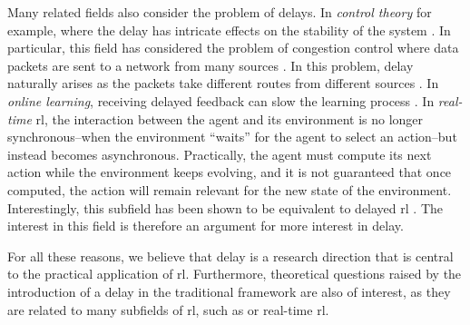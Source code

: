 Many related fields also consider the problem of delays.
In \emph{control theory} for example, \cite{chung1995time, dugard1998stability, niculescu2001delay, gu2003survey, richard2003time, fridman2014introduction} where the delay has intricate effects on the stability of the system \cite{kolmanovskii1999delay}.
In particular, this field has considered the problem of congestion control where data packets are sent to a network from many sources \cite{jacobson1988congestion}.
In this problem, delay naturally arises as the packets take different routes from different sources \cite{witsenhausen1971separation, altman1999congestion,ait2003stability}.
In \emph{online learning}, receiving delayed feedback can slow the learning process \cite{joulani2013online,pike2018bandits,lancewicki2021stochastic}.
In \emph{real-time} \gls{rl}, the interaction between the agent and its environment is no longer synchronous--when the environment ``waits'' for the agent to select an action--but instead becomes asynchronous.
Practically, the agent must compute its next action while the environment keeps evolving, and it is not guaranteed that once computed, the action will remain relevant for the new state of the environment.
Interestingly, this subfield has been shown to be equivalent to delayed \gls{rl} \cite[Theorem~1]{ramstedt2019real}.
The interest in this field \cite{hester2013texplore,caarls2015parallel,travnik2018reactive,ramstedt2019real,xiao2020thinking} is therefore an argument for more interest in delay. 

For all these reasons, we believe that delay is a research direction that is central to the practical application of \gls{rl}. Furthermore, theoretical questions raised by the introduction of a delay in the traditional framework are also of interest, as they are related to many subfields of \gls{rl}, such as  or real-time \gls{rl}.


 
